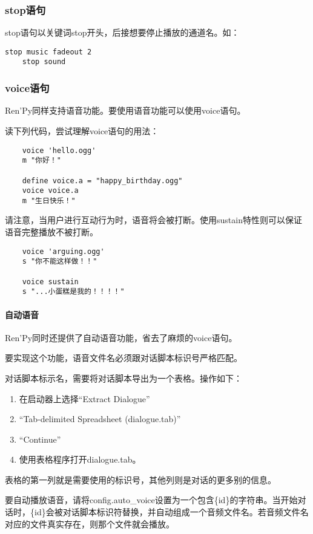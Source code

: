 \subsubsection{stop语句}

stop语句以关键词stop开头，后接想要停止播放的通道名。如：
\begin{lstlisting}[]
    stop music fadeout 2
    stop sound
\end{lstlisting}

\subsubsection{voice语句}
Ren'Py同样支持语音功能。要使用语音功能可以使用voice语句。

读下列代码，尝试理解voice语句的用法：
\begin{lstlisting}
    voice 'hello.ogg'
    m "你好！"

    define voice.a = "happy_birthday.ogg"
    voice voice.a
    m "生日快乐！"
\end{lstlisting}

请注意，当用户进行互动行为时，语音将会被打断。使用sustain特性则可以保证语音完整播放不被打断。
\begin{lstlisting}
    voice 'arguing.ogg'
    s "你不能这样做！！"

    voice sustain
    s "...小蛋糕是我的！！！！"
\end{lstlisting}

\paragraph{自动语音}
Ren'Py同时还提供了自动语音功能，省去了麻烦的voice语句。

要实现这个功能，语音文件名必须跟对话脚本标识号严格匹配。

对话脚本标示名，需要将对话脚本导出为一个表格。操作如下：
\begin{enumerate}
    \item 在启动器上选择“Extract Dialogue”
    \item “Tab-delimited Spreadsheet (dialogue.tab)”
    \item “Continue”
    \item 使用表格程序打开dialogue.tab。
\end{enumerate}

表格的第一列就是需要使用的标识号，其他列则是对话的更多别的信息。

要自动播放语音，请将config.auto\_voice设置为一个包含\{id\}的字符串。当开始对话时，\{id\}会被对话脚本标识符替换，并自动组成一个音频文件名。若音频文件名对应的文件真实存在，则那个文件就会播放。

